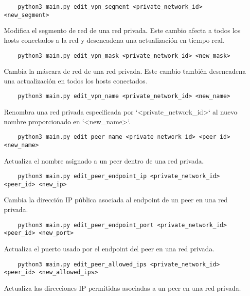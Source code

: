     
    \begin{verbatim}
    python3 main.py edit_vpn_segment <private_network_id> <new_segment>
    \end{verbatim} 
    Modifica el segmento de red de una red privada. Este cambio afecta a todos los hosts conectados a la red y desencadena una actualización en tiempo real.
    
    \begin{verbatim}
    python3 main.py edit_vpn_mask <private_network_id> <new_mask>
    \end{verbatim} 
    Cambia la máscara de red de una red privada. Este cambio también desencadena una actualización en todos los hosts conectados.
    
    \begin{verbatim}
    python3 main.py edit_vpn_name <private_network_id> <new_name>
    \end{verbatim} 
    Renombra una red privada especificada por `<private\_network\_id>` al nuevo nombre proporcionado en `<new\_name>`.
    
   
    
    
    \begin{verbatim}
    python3 main.py edit_peer_name <private_network_id> <peer_id> <new_name>
    \end{verbatim} 
    Actualiza el nombre asignado a un peer dentro de una red privada.
    
    \begin{verbatim}
    python3 main.py edit_peer_endpoint_ip <private_network_id> <peer_id> <new_ip>
    \end{verbatim} 
    Cambia la dirección IP pública asociada al endpoint de un peer en una red privada.
    
    \begin{verbatim}
    python3 main.py edit_peer_endpoint_port <private_network_id> <peer_id> <new_port>
    \end{verbatim} 
    Actualiza el puerto usado por el endpoint del peer en una red privada.
    
    \begin{verbatim}
    python3 main.py edit_peer_allowed_ips <private_network_id> <peer_id> <new_allowed_ips>
    \end{verbatim} 
    Actualiza las direcciones IP permitidas asociadas a un peer en una red privada.
    
